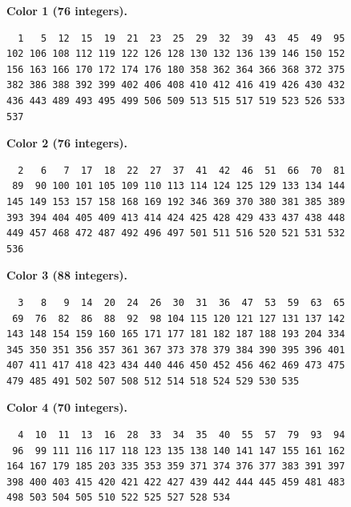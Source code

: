 \noindent\begin{minipage}{\linewidth}
\textbf{Color 1 (76 integers).}
\begin{lstlisting}
  1   5  12  15  19  21  23  25  29  32  39  43  45  49  95
102 106 108 112 119 122 126 128 130 132 136 139 146 150 152
156 163 166 170 172 174 176 180 358 362 364 366 368 372 375
382 386 388 392 399 402 406 408 410 412 416 419 426 430 432
436 443 489 493 495 499 506 509 513 515 517 519 523 526 533
537
\end{lstlisting}
\end{minipage}\par\smallskip

\noindent\begin{minipage}{\linewidth}
\textbf{Color 2 (76 integers).}
\begin{lstlisting}
  2   6   7  17  18  22  27  37  41  42  46  51  66  70  81
 89  90 100 101 105 109 110 113 114 124 125 129 133 134 144
145 149 153 157 158 168 169 192 346 369 370 380 381 385 389
393 394 404 405 409 413 414 424 425 428 429 433 437 438 448
449 457 468 472 487 492 496 497 501 511 516 520 521 531 532
536
\end{lstlisting}
\end{minipage}\par\smallskip

\noindent\begin{minipage}{\linewidth}
\textbf{Color 3 (88 integers).}
\begin{lstlisting}
  3   8   9  14  20  24  26  30  31  36  47  53  59  63  65
 69  76  82  86  88  92  98 104 115 120 121 127 131 137 142
143 148 154 159 160 165 171 177 181 182 187 188 193 204 334
345 350 351 356 357 361 367 373 378 379 384 390 395 396 401
407 411 417 418 423 434 440 446 450 452 456 462 469 473 475
479 485 491 502 507 508 512 514 518 524 529 530 535
\end{lstlisting}
\end{minipage}\par\smallskip

\noindent\begin{minipage}{\linewidth}
\textbf{Color 4 (70 integers).}
\begin{lstlisting}
  4  10  11  13  16  28  33  34  35  40  55  57  79  93  94
 96  99 111 116 117 118 123 135 138 140 141 147 155 161 162
164 167 179 185 203 335 353 359 371 374 376 377 383 391 397
398 400 403 415 420 421 422 427 439 442 444 445 459 481 483
498 503 504 505 510 522 525 527 528 534
\end{lstlisting}
\end{minipage}\par\smallskip

